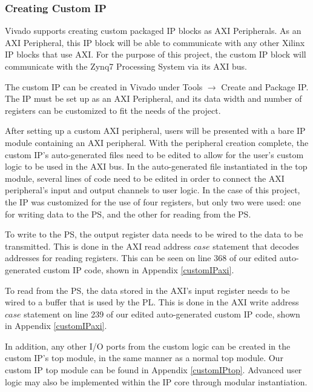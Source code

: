 \subsubsection{Creating Custom IP} \label{sssec:creatingCustomIP}
Vivado supports creating custom packaged IP blocks as AXI Peripherals. As an AXI Peripheral, this IP block will be able to communicate with any other Xilinx IP blocks that use AXI. For the purpose of this project, the custom IP block will communicate with the Zynq7 Processing System via its AXI bus.
\par
The custom IP can be created in Vivado under Tools $\rightarrow$ Create and Package IP. The IP must be set up as an AXI Peripheral, and its data width and number of registers can be customized to fit the needs of the project.
\par
After setting up a custom AXI peripheral, users will be presented with a bare IP module containing an AXI peripheral. With the peripheral creation complete, the custom IP's auto-generated files need to be edited to allow for the user's custom logic to be used in the AXI bus. In the auto-generated file instantiated in the top module, several lines of code need to be edited in order to connect the AXI peripheral's input and output channels to user logic. In the case of this project, the IP was customized for the use of four registers, but only two were used: one for writing data to the PS, and the other for reading from the PS. 
\par
To write to the PS, the output register data needs to be wired to the data to be transmitted. This is done in the AXI read address $case$ statement that decodes addresses for reading registers. This can be seen on line 368 of our edited auto-generated custom IP code, shown in Appendix \ref{customIPaxi}.
\par
To read from the PS, the data stored in the AXI's input register needs to be wired to a buffer that is used by the PL. This is done in the AXI write address $case$ statement on line 239 of our edited auto-generated custom IP code, shown in Appendix \ref{customIPaxi}.
\par
In addition, any other I/O ports from the custom logic can be created in the custom IP's top module, in the same manner as a normal top module. Our custom IP top module can be found in Appendix \ref{customIPtop}. Advanced user logic may also be implemented within the IP core through modular instantiation.

